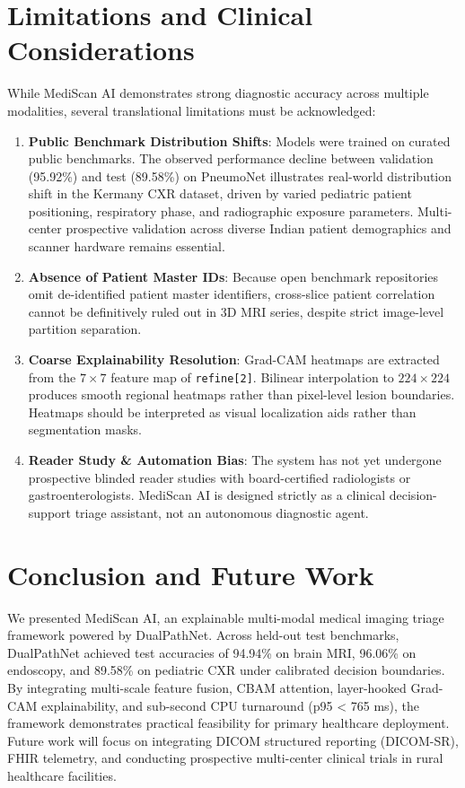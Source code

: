 \documentclass[conference]{IEEEtran}
\begin{document}
\section{Limitations and Clinical Considerations}
While MediScan AI demonstrates strong diagnostic accuracy across multiple modalities, several translational limitations must be acknowledged:
\begin{enumerate}
    \item \textbf{Public Benchmark Distribution Shifts}: Models were trained on curated public benchmarks. The observed performance decline between validation (95.92\%) and test (89.58\%) on PneumoNet illustrates real-world distribution shift in the Kermany CXR dataset, driven by varied pediatric patient positioning, respiratory phase, and radiographic exposure parameters. Multi-center prospective validation across diverse Indian patient demographics and scanner hardware remains essential.
    \item \textbf{Absence of Patient Master IDs}: Because open benchmark repositories \cite{kermany2018identifying, afshar2019capsule} omit de-identified patient master identifiers, cross-slice patient correlation cannot be definitively ruled out in 3D MRI series, despite strict image-level partition separation.
    \item \textbf{Coarse Explainability Resolution}: Grad-CAM heatmaps are extracted from the $7\times 7$ feature map of \texttt{refine[2]}. Bilinear interpolation to $224\times 224$ produces smooth regional heatmaps rather than pixel-level lesion boundaries. Heatmaps should be interpreted as visual localization aids rather than segmentation masks.
    \item \textbf{Reader Study \& Automation Bias}: The system has not yet undergone prospective blinded reader studies with board-certified radiologists or gastroenterologists. MediScan AI is designed strictly as a clinical decision-support triage assistant, not an autonomous diagnostic agent.
\end{enumerate}

\section{Conclusion and Future Work}
We presented MediScan AI, an explainable multi-modal medical imaging triage framework powered by DualPathNet. Across held-out test benchmarks, DualPathNet achieved test accuracies of 94.94\% on brain MRI, 96.06\% on endoscopy, and 89.58\% on pediatric CXR under calibrated decision boundaries. By integrating multi-scale feature fusion, CBAM attention, layer-hooked Grad-CAM explainability, and sub-second CPU turnaround (p95 < 765 ms), the framework demonstrates practical feasibility for primary healthcare deployment. Future work will focus on integrating DICOM structured reporting (DICOM-SR), FHIR telemetry, and conducting prospective multi-center clinical trials in rural healthcare facilities.
\end{document}
